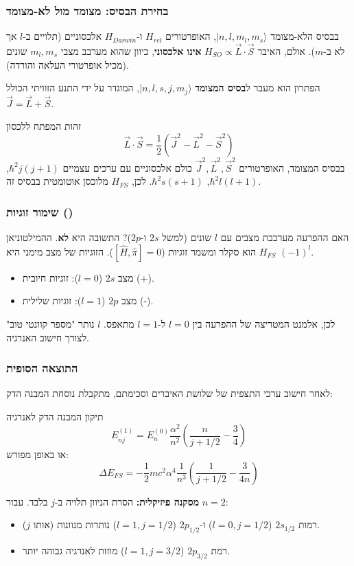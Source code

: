 \subsubsection{בחירת הבסיס: מצומד מול לא-מצומד}
בבסיס הלא-מצומד $|n, l, m_l, m_s\rangle$, האופרטורים $H_{rel}$ ו-$H_{Darwin}$ אלכסוניים (תלויים ב-$l$ אך לא ב-$m$).
אולם, האיבר $H_{SO} \propto \vec{L} \cdot \vec{S}$ \textbf{אינו אלכסוני}, כיוון שהוא מערבב מצבי $m_l, m_s$ שונים (מכיל אופרטורי העלאה והורדה).

הפתרון הוא מעבר ל\textbf{בסיס המצומד} $|n, l, s, j, m_j\rangle$, המוגדר על ידי התנע הזוויתי הכולל $\vec{J} = \vec{L} + \vec{S}$.
\begin{notebox}{זהות המפתח ללכסון}
\[ \vec{L} \cdot \vec{S} = \frac{1}{2} \left( \vec{J}^2 - \vec{L}^2 - \vec{S}^2 \right) \]
בבסיס המצומד, האופרטורים $\vec{J}^2, \vec{L}^2, \vec{S}^2$ כולם אלכסוניים עם ערכים עצמיים $\hbar^2 j(j+1)$, $\hbar^2 l(l+1)$, $\hbar^2 s(s+1)$.
לכן, $H_{FS}$ מלוכסן אוטומטית בבסיס זה.
\end{notebox}

\subsubsection{\texorpdfstring{שימור זוגיות ()}{שימור זוגיות (Parity)}}
האם ההפרעה מערבבת מצבים עם $l$ שונים (למשל $2s$ ו-$2p$)?
התשובה היא \textbf{לא}. ההמילטוניאן $H_{FS}$ הוא סקלר ומשמר זוגיות ($[\hat{H}, \hat{\pi}] = 0$).
הזוגיות של מצב מימני היא $(-1)^l$.
\begin{itemize}
    \item מצב $2s$ ($l=0$): זוגיות חיובית (+).
    \item מצב $2p$ ($l=1$): זוגיות שלילית (-).
\end{itemize}
לכן, אלמנט המטריצה של ההפרעה בין $l=0$ ל-$l=1$ מתאפס. $l$ נותר "מספר קוונטי טוב" לצורך חישוב האנרגיה.

\subsubsection{התוצאה הסופית}
לאחר חישוב ערכי התצפית של שלושת האיברים וסכימתם, מתקבלת נוסחת המבנה הדק:
\begin{resultbox}{תיקון המבנה הדק לאנרגיה}
\[ E_{nj}^{(1)} = E_n^{(0)} \frac{\alpha^2}{n^2} \left( \frac{n}{j+1/2} - \frac{3}{4} \right) \]
או באופן מפורש:
\[ \Delta E_{FS} = -\frac{1}{2}mc^2\alpha^4 \frac{1}{n^3} \left( \frac{1}{j+1/2} - \frac{3}{4n} \right) \]
\end{resultbox}
\textbf{מסקנה פיזיקלית:} הסרת הניוון תלויה ב-$j$ בלבד.
עבור $n=2$:
\begin{itemize}
    \item רמות $2s_{1/2}$ ($l=0, j=1/2$) ו-$2p_{1/2}$ ($l=1, j=1/2$) נותרות מנוונות (אותו $j$).
    \item רמת $2p_{3/2}$ ($l=1, j=3/2$) מוזזת לאנרגיה גבוהה יותר.
\end{itemize}

